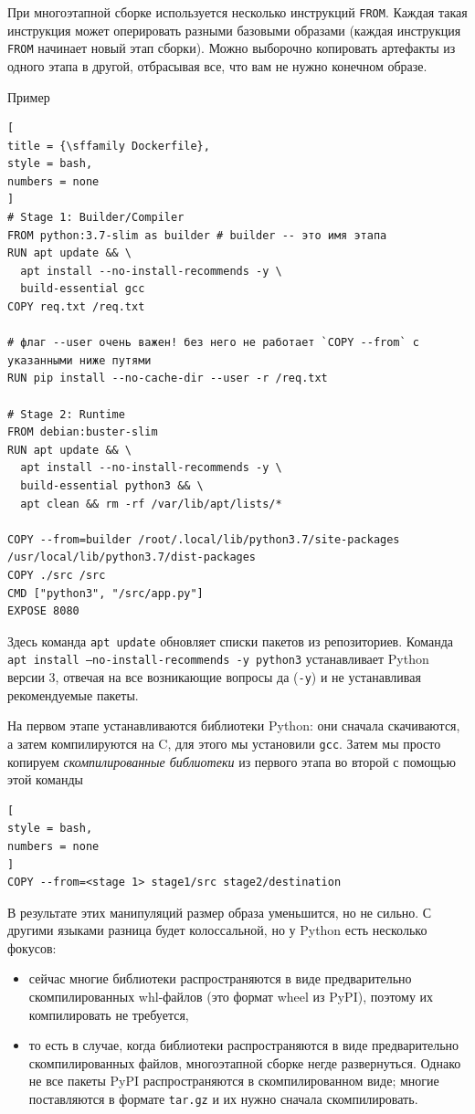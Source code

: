 \documentclass[%
	11pt,
	a4paper,
	utf8,
		]{article}
\begin{document}
При многоэтапной сборке используется несколько инструкций \texttt{FROM}. Каждая такая инструкция может оперировать разными базовыми образами (каждая инструкция \texttt{FROM} начинает новый этап сборки). Можно выборочно копировать артефакты из одного этапа в другой, отбрасывая все, что вам не нужно конечном образе.

Пример
\begin{lstlisting}[
title = {\sffamily Dockerfile},
style = bash,
numbers = none	
]
# Stage 1: Builder/Compiler
FROM python:3.7-slim as builder # builder -- это имя этапа
RUN apt update && \
  apt install --no-install-recommends -y \
  build-essential gcc
COPY req.txt /req.txt

# флаг --user очень важен! без него не работает `COPY --from` с указанными ниже путями
RUN pip install --no-cache-dir --user -r /req.txt

# Stage 2: Runtime
FROM debian:buster-slim
RUN apt update && \
  apt install --no-install-recommends -y \
  build-essential python3 && \
  apt clean && rm -rf /var/lib/apt/lists/*
  
COPY --from=builder /root/.local/lib/python3.7/site-packages /usr/local/lib/python3.7/dist-packages
COPY ./src /src
CMD ["python3", "/src/app.py"]
EXPOSE 8080
\end{lstlisting}

Здесь команда \texttt{apt update} обновляет списки пакетов из репозиториев. Команда \texttt{apt install --no-install-recommends -y python3} устанавливает Python версии 3, отвечая на все возникающие вопросы да (\verb|-y|) и не устанавливая рекомендуемые пакеты.

На первом этапе устанавливаются библиотеки Python: они сначала скачиваются, а затем компилируются на C, для этого мы установили \texttt{gcc}. Затем мы просто копируем \emph{скомпилированные библиотеки} из первого этапа во второй с помощью этой команды
\begin{lstlisting}[
style = bash,
numbers = none	
]
COPY --from=<stage 1> stage1/src stage2/destination
\end{lstlisting}

В результате этих манипуляций размер образа уменьшится, но не сильно. С другими языками разница будет колоссальной, но у Python есть несколько фокусов:
\begin{itemize}
	\item сейчас многие библиотеки распространяются в виде предварительно скомпилированных whl-файлов (это формат wheel из PyPI), поэтому их компилировать не требуется,
	
	\item то есть в случае, когда библиотеки распространяются в виде предварительно скомпилированных файлов, многоэтапной сборке негде развернуться. Однако не все пакеты PyPI распространяются в скомпилированном виде; многие поставляются в формате \texttt{tar.gz} и их нужно сначала скомпилировать.
\end{itemize}
\end{document}
